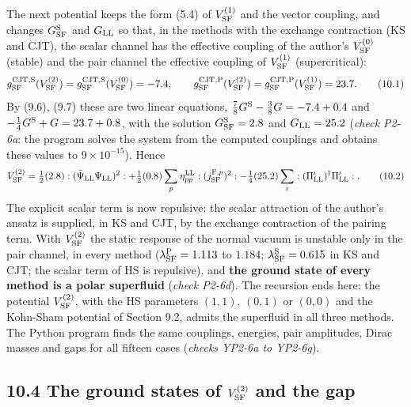 \documentclass[
  10pt,
]{article}
\begin{document}
The next potential keeps the form (5.4) of \(V^{(1)}_{\rm SF}\) and the
vector coupling, and changes \(G^{\rm S}_{\rm SF}\) and \(G_{\rm LL}\)
so that, in the methods with the exchange contraction (KS and CJT), the
scalar channel has the effective coupling of the author's
\(V^{(0)}_{\rm SF}\) (stable) and the pair channel the effective
coupling of \(V^{(1)}_{\rm SF}\) (supercritical):
\[g^{{\rm CJT},{\rm S}}_{\rm SF}(V^{(2)}_{\rm SF})=g^{{\rm CJT},{\rm S}}_{\rm SF}(V^{(0)}_{\rm SF})=-7.4,\qquad g^{{\rm CJT},{\rm P}}_{\rm SF}(V^{(2)}_{\rm SF})=g^{{\rm CJT},{\rm P}}_{\rm SF}(V^{(1)}_{\rm SF})=23.7.\tag{10.1}\]
By (9.6), (9.7) these are two linear equations,
\(\tfrac78G^{\rm S}-\tfrac38G=-7.4+0.4\) and
\(-\tfrac14G^{\rm S}+G=23.7+0.8\), with the solution
\(G^{\rm S}_{\rm SF}=2.8\) and \(G_{\rm LL}=25.2\) (\emph{check P2-6a}:
the program solves the system from the computed couplings and obtains
these values to \(9\times10^{-15}\)). Hence
\[V^{(2)}_{\rm SF}=\tfrac12(2.8):(\bar\Psi_{\rm LL}\Psi_{\rm LL})^2:+\tfrac12(0.8)\sum_p\eta^{\rm LL}_{pp}:(j^{{\rm F},p}_{\rm SF})^2:-\tfrac14(25.2)\sum_\iota:(\Pi^\iota_{\rm LL})^\dagger\Pi^\iota_{\rm LL}:.\tag{10.2}\]
The explicit scalar term is now repulsive: the scalar attraction of the
author's ansatz is supplied, in KS and CJT, by the exchange contraction
of the pairing term. With \(V^{(2)}_{\rm SF}\) the static response of
the normal vacuum is unstable only in the pair channel, in every method
(\(\lambda^{\rm P}_{\rm SF}=1.113\) to \(1.184\);
\(\lambda^{\rm S}_{\rm SF}=0.615\) in KS and CJT; the scalar term of HS
is repulsive), and \textbf{the ground state of every method is a polar
superfluid} (\emph{check P2-6d}). The recursion ends here: the potential
\(V^{(2)}_{\rm SF}\), with the HS parameters \((1,1)\), \((0,1)\) or
\((0,0)\) and the Kohn-Sham potential of Section 9.2, admits the
superfluid in all three methods. The Python program finds the same
couplings, energies, pair amplitudes, Dirac masses and gaps for all
fifteen cases (\emph{checks YP2-6a to YP2-6g}).

\hypertarget{the-ground-states-of-v2_rm-sf-and-the-gap}{%
\subsection{\texorpdfstring{10.4 The ground states of
\(V^{(2)}_{\rm SF}\) and the
gap}{10.4 The ground states of V\^{}\{(2)\}\_\{\textbackslash rm SF\} and the gap}}\label{the-ground-states-of-v2_rm-sf-and-the-gap}}
\end{document}
